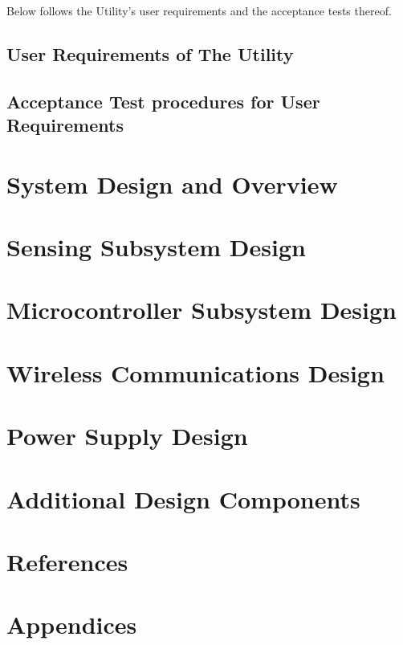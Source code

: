 \documentclass[12pt]{article}
\begin{document}
Below follows the Utility's user requirements and the acceptance tests thereof.

\subsection{User Requirements of The Utility}

\subsection{Acceptance Test procedures for User Requirements}


\section{System Design and Overview}

\section{Sensing  Subsystem Design}

\section{Microcontroller Subsystem Design}

\section{Wireless Communications Design}

\section{Power Supply Design}

\section{Additional Design Components}

\section{References}

\section{Appendices}
\end{document}

